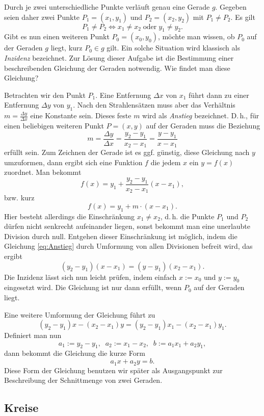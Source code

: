 Durch je zwei unterschiedliche Punkte verläuft genau eine Gerade $g$.
Gegeben seien daher zwei Punkte $P_1=(x_1,y_1)$ und $P_2=(x_2,y_2)$
mit $P_1\ne P_2$. Es gilt%
\[P_1\ne P_2 \iff x_1\ne x_2\;\text{oder}\; y_1\ne y_2.\]
Gibt es nun einen weiteren Punkt $P_0=(x_0,y_0)$, möchte man wissen, ob
$P_0$ auf der Geraden $g$ liegt, kurz $P_0\in g$ gilt. Ein solche
Situation wird klassisch als \emph{Inzidenz} bezeichnet. Zur Lösung
dieser Aufgabe ist die Bestimmung einer beschreibenden Gleichung
der Geraden notwendig. Wie findet man diese Gleichung?

Betrachten wir den Punkt $P_1$. Eine Entfernung $\Delta x$ von $x_1$
führt dann zu einer Entfernung $\Delta y$ von $y_1$. Nach den
Strahlensätzen muss aber das Verhältnis $m=\frac{\Delta y}{\Delta x}$
eine Konstante sein. Dieses feste $m$ wird als \emph{Anstieg}
bezeichnet. D.\,h., für einen beliebigen weiteren
Punkt $P=(x,y)$ auf der Geraden muss die Beziehung%
\begin{equation}\label{eq:Anstieg}
m = \frac{\Delta y}{\Delta x} = \frac{y_2-y_1}{x_2-x_1}
= \frac{y-y_1}{x-x_1}
\end{equation}
erfüllt sein. Zum Zeichnen der Gerade ist es ggf. günstig,
diese Gleichung nach $y$ umzuformen, dann ergibt sich eine
Funktion $f$ die jedem $x$ ein $y=f(x)$ zuordnet. Man bekommt%
\[f(x) = y_1+\frac{y_2-y_1}{x_2-x_1}(x-x_1),\]
bzw. kurz
\[f(x) = y_1+m\cdot (x-x_1).\]
Hier besteht allerdings die Einschränkung $x_1\ne x_2$, d.\,h. die
Punkte $P_1$ und $P_2$ dürfen nicht senkrecht aufeinander liegen,
sonst bekommt man eine unerlaubte Division durch null. Entgehen dieser
Einschränkung ist möglich, indem die Gleichung \eqref{eq:Anstieg}
durch Umformung von allen Divisionen befreit wird, das ergibt%
\[(y_2-y_1)(x-x_1) = (y-y_1)(x_2-x_1).\]
Die Inzidenz lässt sich nun leicht prüfen, indem einfach
$x:=x_0$ und $y:=y_0$ eingesetzt wird. Die Gleichung ist nur
dann erfüllt, wenn $P_0$ auf der Geraden liegt.

Eine weitere Umformung der Gleichung führt zu
\[(y_2-y_1)x-(x_2-x_1)y
= (y_2-y_1)x_1-(x_2-x_1)y_1.\]
Definiert man nun
\[a_1:=y_2-y_1,\;\; a_2:=x_1-x_2,\;\; b:=a_1x_1+a_2y_1,\]
dann bekommt die Gleichung die kurze Form
\begin{equation}\label{eq:Gerade-kurz}
a_1 x + a_2 y = b.
\end{equation}
Diese Form der Gleichung benutzen wir später als Ausgangspunkt
zur Beschreibung der Schnittmenge von zwei Geraden.

\subsection{Kreise}

